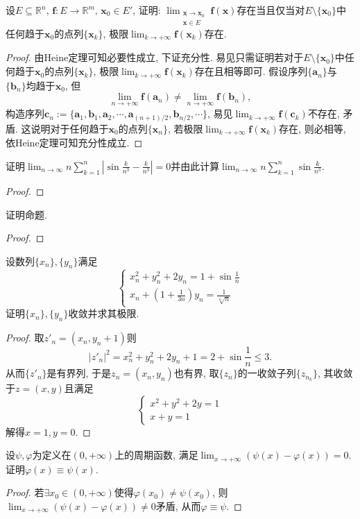 \begin{quiza}
\woestar 设\(E\subseteq\mathbb{R}^n\), \(\boldsymbol{f}:E\rightarrow\mathbb{R}^m,\,\boldsymbol{x}_0\in E'\), 证明: \(\lim_{\substack{\boldsymbol{x}\rightarrow\boldsymbol{x}_0\\\boldsymbol{x}\in E}}\boldsymbol{f}(\boldsymbol{x})\)存在当且仅当对\(E\setminus\{\boldsymbol{x}_0\}\)中任何趋于\(\boldsymbol{x}_0\)的点列\(\{\boldsymbol{x}_k\}\), 极限\(\lim_{k\rightarrow+\infty}\boldsymbol{f}(\boldsymbol{x}_k)\)存在.
\begin{proof}
由Heine定理可知必要性成立, 下证充分性. 易见只需证明若对于\(E\setminus\{\boldsymbol{x}_0\}\)中任何趋于\(\boldsymbol{x}_0\)的点列\(\{\boldsymbol{x}_k\}\), 极限\(\lim_{k\rightarrow+\infty}\boldsymbol{f}(\boldsymbol{x}_k)\)存在且相等即可. 假设序列\(\{\boldsymbol{a}_n\}\)与\(\{\boldsymbol{b}_n\}\)均趋于\(\boldsymbol{x}_0\), 但\[\lim_{n\rightarrow+\infty}\boldsymbol{f}(\boldsymbol{a}_n)\ne \lim_{n\rightarrow+\infty}\boldsymbol{f}(\boldsymbol{b}_n),\]构造序列\(\boldsymbol{c}_n:=\{\boldsymbol{a}_1,\boldsymbol{b}_1,\boldsymbol{a}_2,\cdots,\boldsymbol{a}_{(n+1)/2},\boldsymbol{b}_{n/2},\cdots\}\), 易见\(\lim_{k\rightarrow+\infty}\boldsymbol{f}(\boldsymbol{c}_k)\)不存在, 矛盾. 这说明对于任何趋于\(\boldsymbol{x}_0\)的点列\(\{\boldsymbol{x}_n\}\), 若极限\(\lim_{k\rightarrow+\infty}\boldsymbol{f}(\boldsymbol{x}_k)\)存在, 则必相等, 依Heine定理可知充分性成立.
\end{proof}
\woe 证明\(\lim_{n\rightarrow\infty}n\sum_{k=1}^{n}\left|\sin\frac{k}{n^3}-\frac{k}{n^3}\right|=0\)并由此计算\(\lim_{n\rightarrow\infty}n\sum_{k=1}^{n}\sin\frac{k}{n^3}\).
\begin{proof}

\end{proof}
\woe 证明命题.
\begin{proof}
\end{proof}
\woe 设数列\(\{x_n\},\{y_n\}\)满足\[\begin{cases}
    x_n^2+y_n^2+2y_n=1+\sin\frac{1}{n}\\
    x_n+\left(1+\frac{1}{3n}\right)y_n=\frac{1}{\sqrt[n]{n}}
\end{cases}\]
证明\(\{x_n\},\{y_n\}\)收敛并求其极限.
\begin{proof}
取\(z'_n=(x_n,y_n+1)\)则\[|z'_n|^2=x_n^2+y_n^2+2y_n+1=2+\sin\frac{1}{n}\leqslant 3.\]从而\(\{z'_n\}\)是有界列, 于是\(z_n=(x_n,y_n)\)也有界, 取\(\{z_n\}\)的一收敛子列\(\{z_{n_k}\}\), 其收敛于\(z=(x,y)\)且满足\[\begin{cases}
    x^2+y^2+2y=1\\
    x+y=1
\end{cases}\]解得\(x=1,y=0\).
\end{proof}
\woe 设\(\psi,\varphi\)为定义在\((0,+\infty)\)上的周期函数, 满足\(\lim_{x\rightarrow+\infty}\left(\psi(x)-\varphi(x)\right)=0\). 证明\(\varphi(x)\equiv\psi(x)\).
\begin{proof}
若\(\exists x_0\in (0,+\infty)\)使得\(\varphi(x_0)\ne\psi(x_0)\), 则\(\lim_{x\rightarrow+\infty}\left(\psi(x)-\varphi(x)\right)\ne 0\)矛盾, 从而\(\varphi\equiv\psi\).
\end{proof}
\end{quiza}
